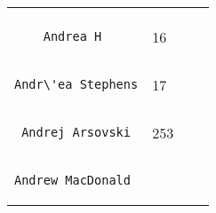 \documentclass[]{article}
\begin{document}
\begin{longtable}[c]{@{}llll@{}}
\begin{minipage}[t]{0.15\columnwidth}
\end{minipage}
\\\noalign{\medskip}
\begin{minipage}[t]{0.39\columnwidth}\raggedright
\begin{verbatim}
    Andrea H
\end{verbatim}
\end{minipage} & \begin{minipage}[t]{0.10\columnwidth}\raggedright
16
\end{minipage} & \begin{minipage}[t]{0.13\columnwidth}\raggedright
\end{minipage} & \begin{minipage}[t]{0.15\columnwidth}\raggedright
\end{minipage}
\\\noalign{\medskip}
\begin{minipage}[t]{0.39\columnwidth}\raggedright
\begin{verbatim}
Andr\'ea Stephens
\end{verbatim}
\end{minipage} & \begin{minipage}[t]{0.10\columnwidth}\raggedright
17
\end{minipage} & \begin{minipage}[t]{0.13\columnwidth}\raggedright
\end{minipage} & \begin{minipage}[t]{0.15\columnwidth}\raggedright
\end{minipage}
\\\noalign{\medskip}
\begin{minipage}[t]{0.39\columnwidth}\raggedright
\begin{verbatim}
 Andrej Arsovski
\end{verbatim}
\end{minipage} & \begin{minipage}[t]{0.10\columnwidth}\raggedright
253
\end{minipage} & \begin{minipage}[t]{0.13\columnwidth}\raggedright
\end{minipage} & \begin{minipage}[t]{0.15\columnwidth}\raggedright
\end{minipage}
\\\noalign{\medskip}
\begin{minipage}[t]{0.39\columnwidth}\raggedright
\begin{verbatim}
Andrew MacDonald

\end{verbatim}
\end{minipage}
\end{longtable}
\end{document}
